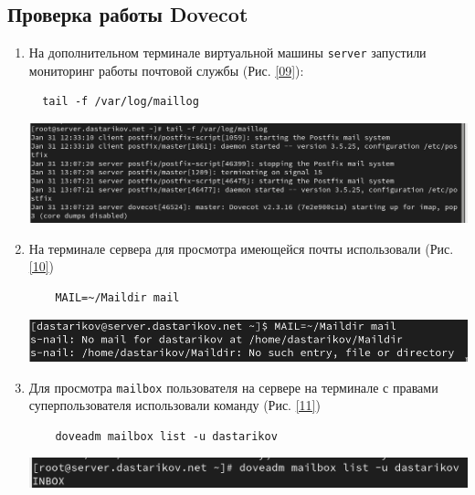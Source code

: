 \subsection{Проверка работы Dovecot}
\begin{enumerate}
\item На дополнительном терминале виртуальной машины \texttt{server} запустили мониторинг работы почтовой службы (Рис. \ref{09}):
\begin{verbatim}
  tail -f /var/log/maillog
\end{verbatim}
\begin{center}
    \centering
    \includegraphics[width=\textwidth]{../images/image09.png}
    \label{09}
\end{center}

\item На терминале сервера для просмотра имеющейся почты использовали  (Рис. \ref{10})
  \begin{verbatim}
    MAIL=~/Maildir mail
  \end{verbatim}
\begin{center}
    \centering
    \includegraphics[width=\textwidth]{../images/image10.png}
    \label{10}
\end{center}

\item Для просмотра \texttt{mailbox} пользователя на сервере на терминале с правами суперпользователя использовали команду (Рис. \ref{11})
  \begin{verbatim}
    doveadm mailbox list -u dastarikov
  \end{verbatim}
\begin{center}
    \centering
    \includegraphics[width=\textwidth]{../images/image11.png}
    \label{11}
\end{center}


\end{enumerate}
